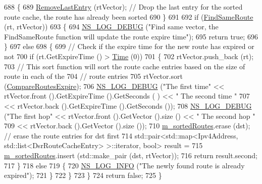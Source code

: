 \begin{DoxyCode}
688         \{
689           \hyperlink{classns3_1_1dsr_1_1DsrRouteCache_ad02a476e6b440f517898c11bffac4f27}{RemoveLastEntry} (rtVector);         \textcolor{comment}{// Drop the last entry for the sorted route
       cache, the route has already been sorted}
690         \}
691 
692       \textcolor{keywordflow}{if} (\hyperlink{classns3_1_1dsr_1_1DsrRouteCache_a881db5104e9bb9b45e4ec836b0a802da}{FindSameRoute} (rt, rtVector))
693         \{
694           \hyperlink{group__logging_ga413f1886406d49f59a6a0a89b77b4d0a}{NS\_LOG\_DEBUG} (\textcolor{stringliteral}{"Find same vector, the FindSameRoute function will update the route
       expire time"});
695           \textcolor{keywordflow}{return} \textcolor{keyword}{true};
696         \}
697       \textcolor{keywordflow}{else}
698         \{
699           \textcolor{comment}{// Check if the expire time for the new route has expired or not}
700           \textcolor{keywordflow}{if} (rt.GetExpireTime () > \hyperlink{namespacens3_1_1TracedValueCallback_a7ffd3e7c142ffe7c8a1d2db9b8de38ec}{Time} (0))
701             \{
702               rtVector.push\_back (rt);
703               \textcolor{comment}{// This sort function will sort the route cache entries based on the size of route in each of
       the}
704               \textcolor{comment}{// route entries}
705               rtVector.sort (\hyperlink{namespacens3_1_1dsr_a53bce2b069de9151de0203d96468684e}{CompareRoutesExpire});
706               \hyperlink{group__logging_ga413f1886406d49f59a6a0a89b77b4d0a}{NS\_LOG\_DEBUG} (\textcolor{stringliteral}{"The first time"} << rtVector.front ().GetExpireTime ().GetSeconds (
      ) << \textcolor{stringliteral}{" The second time "}
707                                              << rtVector.back ().GetExpireTime ().GetSeconds ());
708               \hyperlink{group__logging_ga413f1886406d49f59a6a0a89b77b4d0a}{NS\_LOG\_DEBUG} (\textcolor{stringliteral}{"The first hop"} << rtVector.front ().GetVector ().size () << \textcolor{stringliteral}{" The
       second hop "}
709                                             << rtVector.back ().GetVector ().size ());
710               \hyperlink{classns3_1_1dsr_1_1DsrRouteCache_a8d3530713c7152dbe42d0b616d9c1d96}{m\_sortedRoutes}.erase (dst);               \textcolor{comment}{// erase the route entries for dst
       first}
714 \textcolor{comment}{}              std::pair<std::map<Ipv4Address, std::list<DsrRouteCacheEntry> >::iterator, \textcolor{keywordtype}{bool}> result =
715                 \hyperlink{classns3_1_1dsr_1_1DsrRouteCache_a8d3530713c7152dbe42d0b616d9c1d96}{m\_sortedRoutes}.insert (std::make\_pair (dst, rtVector));
716               \textcolor{keywordflow}{return} result.second;
717             \}
718           \textcolor{keywordflow}{else}
719             \{
720               \hyperlink{group__logging_gafbd73ee2cf9f26b319f49086d8e860fb}{NS\_LOG\_INFO} (\textcolor{stringliteral}{"The newly found route is already expired"});
721             \}
722         \}
723     \}
724   \textcolor{keywordflow}{return} \textcolor{keyword}{false};
725 \}
\end{DoxyCode}


